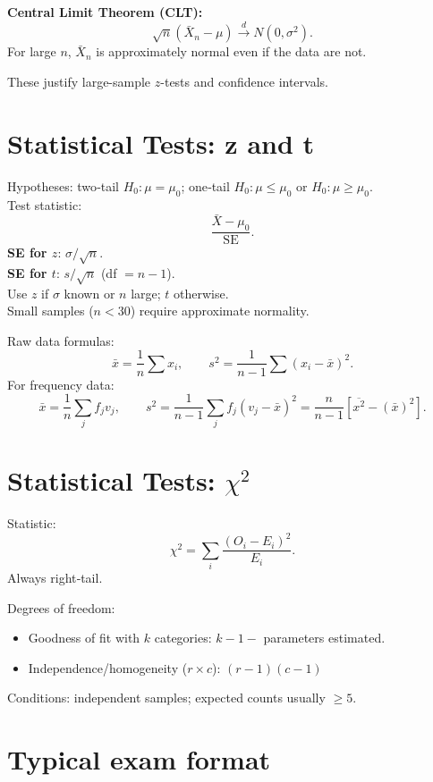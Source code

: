 \documentclass[11pt]{article}
\begin{document}
\textbf{Central Limit Theorem (CLT):}
\[
\sqrt{n}(\bar X_n - \mu) \xrightarrow{d} N(0, \sigma^2).
\]
For large $n$, $\bar X_n$ is approximately normal even if the data are not.

These justify large-sample $z$-tests and confidence intervals.

\section{Statistical Tests: z and t}

\begin{keybox}
Hypotheses: two‑tail $H_0: \mu=\mu_0$; one‑tail $H_0: \mu\le \mu_0$ or $H_0: \mu\ge \mu_0$.\\
Test statistic:
\[
\frac{\bar X-\mu_0}{\mathrm{SE}}.
\]
\textbf{SE for $z$}: $\sigma/\sqrt{n}$.\\
\textbf{SE for $t$}: $s/\sqrt{n}$ (df $=n-1$).\\
Use $z$ if $\sigma$ known or $n$ large; $t$ otherwise.\\
Small samples ($n<30$) require approximate normality. 
\end{keybox}

Raw data formulas:
\[
\bar x=\frac1n\sum x_i,
\qquad
s^2=\frac1{n-1}\sum (x_i-\bar x)^2.
\]
For frequency data:
\[
\bar x=\frac{1}{n}\sum_j f_j v_j,
\qquad
s^2=\frac1{n-1}\sum_j f_j (v_j-\bar x)^2=\frac n{n-1}\left[\overline{x^2}-(\bar x)^2\right].
\]

\section{Statistical Tests: $\chi^2$}
Statistic:
\[
\chi^2=\sum_i \frac{(O_i-E_i)^2}{E_i}.
\]
Always right‑tail.

Degrees of freedom:
\begin{itemize}
    \item Goodness of fit with $k$ categories: $k-1-$ parameters estimated.
    \item Independence/homogeneity ($r\times c$): $(r-1)(c-1)$ 
\end{itemize}
Conditions: independent samples; expected counts usually $\ge5$.

\section*{Typical exam format}
\end{document}
